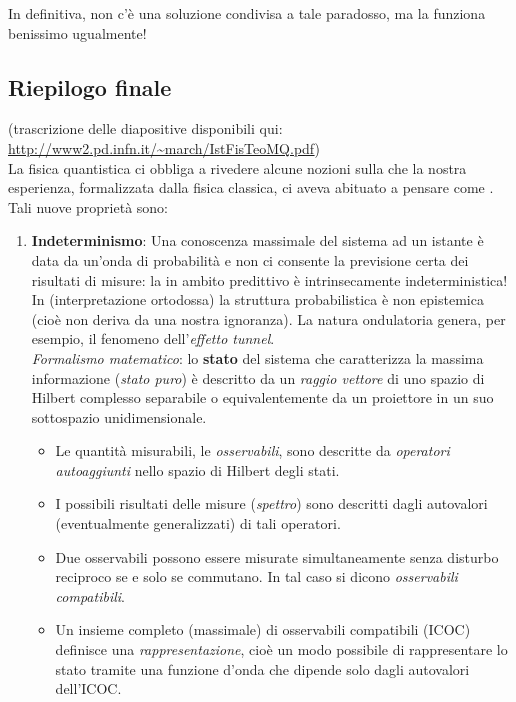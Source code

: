 \documentclass[../../FisicaTeorica.tex]{subfiles}
\begin{document}
In definitiva, non c'è una soluzione condivisa a tale paradosso, ma la \MQ funziona benissimo ugualmente!

\subsection{Riepilogo finale}
(trascrizione delle diapositive disponibili qui: \url{http://www2.pd.infn.it/~march/IstFisTeoMQ.pdf})\\
La fisica quantistica ci obbliga a rivedere alcune nozioni sulla  che la nostra esperienza, formalizzata dalla fisica classica, ci aveva abituato a pensare come .\\
Tali nuove proprietà sono:
\begin{enumerate}
\item \textbf{Indeterminismo}: Una conoscenza massimale del sistema ad un istante è data da un'onda di probabilità e non ci consente la previsione certa dei risultati di misure: la  in ambito predittivo è intrinsecamente indeterministica!\\
In \MQ (interpretazione ortodossa) la struttura probabilistica è non epistemica (cioè non deriva da una nostra ignoranza). La natura ondulatoria genera, per esempio, il fenomeno dell'\textit{effetto tunnel}.\\
\textit{Formalismo matematico}: lo \textbf{stato} del sistema che caratterizza la massima informazione (\textit{stato puro}) è descritto da un \textit{raggio vettore} di uno spazio di Hilbert complesso separabile o equivalentemente da un proiettore in un suo sottospazio unidimensionale.
\begin{itemize}
\item  Le quantità misurabili, le \textit{osservabili}, sono descritte da \textit{operatori} \textit{autoaggiunti} nello spazio di Hilbert degli stati.
\item I possibili risultati delle misure (\textit{spettro}) sono descritti dagli autovalori (eventualmente generalizzati) di tali operatori.
\item Due osservabili possono essere misurate simultaneamente senza disturbo reciproco se e solo se commutano. In tal caso si dicono \textit{osservabili compatibili}.
\item Un insieme completo (massimale) di osservabili compatibili (ICOC) definisce una \textit{rappresentazione}, cioè un modo possibile di rappresentare lo stato tramite una funzione d'onda che dipende solo dagli autovalori dell'ICOC.
\end{itemize} 

\end{enumerate}
\end{document}
